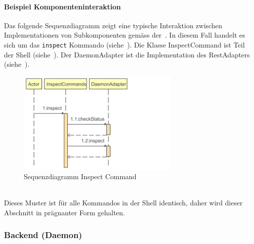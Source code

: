 \documentclass[a4paper,12pt]{report}
\begin{document}
    \paragraph*{Beispiel Komponenteninteraktion}
    Das folgende Sequenzdiagramm zeigt eine typische Interaktion zwischen Implementationen von Subkomponenten gemäss der~.
    In diesem Fall handelt es sich um das \texttt{inspect} Kommando (siehe~).
    Die Klasse InspectCommand ist Teil der Shell (siehe~). Der DaemonAdapter ist die Implementation des RestAdapters (siehe~).
    \begin{figure}[h]
        \centering
        \includegraphics[width=0.7\textwidth]{assets/InspectCommands_inspect_seq_diag}
        \caption{Sequenzdiagramm Inspect Command}
        \label{fig:seq-diag-inspect-commands}
    \end{figure}
    \\Dieses Muster ist für alle Kommandos in der Shell identisch, daher wird dieser Abschnitt in prägnanter Form gehalten.

    \subsubsection{Backend (Daemon)}
\end{document}
